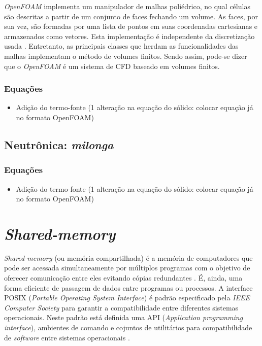 \textit{OpenFOAM} implementa um manipulador de malhas poliédrico, no qual células são descritas a partir
de um conjunto de faces fechando um volume. As faces, por sua vez, são formadas por uma lista de pontos
em suas coordenadas cartesianas e armazenados como vetores. Esta implementação é independente da discretização
usada \cite{Jasak2009}. Entretanto, as principais classes que herdam as funcionalidades das malhas implementam o método de
volumes finitos. Sendo assim, pode-se dizer que o \textit{OpenFOAM} é um sistema de CFD baseado em volumes
finitos.

\subsubsection{Equações}

\begin{itemize}
\item Adição do termo-fonte (1 alteração na equação do sólido: colocar equação já no formato OpenFOAM)
\end{itemize}

\subsection{Neutrônica: \textit{milonga}}
\label{subsection:milonga}

\subsubsection{Equações}

\begin{itemize}
\item Adição do termo-fonte (1 alteração na equação do sólido: colocar equação já no formato OpenFOAM)
\end{itemize}

\section{\textit{Shared-memory}}

\textit{Shared-memory} (ou memória compartilhada) é a memória de computadores que pode ser
acessada simultaneamente por múltiplos programas com o objetivo de oferecer comunicação entre
eles evitando cópias redundantes \cite{Robbins2003}. É, ainda, uma forma eficiente de passagem de dados entre programas
ou processos. A interface POSIX (\textit{Portable Operating System Interface}) é padrão especificado pela
\textit{IEEE Computer Society} para garantir a compatibilidade entre diferentes sistemas operacionais. Neste padrão
está definida uma API (\textit{Application programming interface}), ambientes de comando e cojuntos de utilitários
para compatibilidade de \textit{software} entre sistemas operacionais \cite{Atlidakis2016}.

